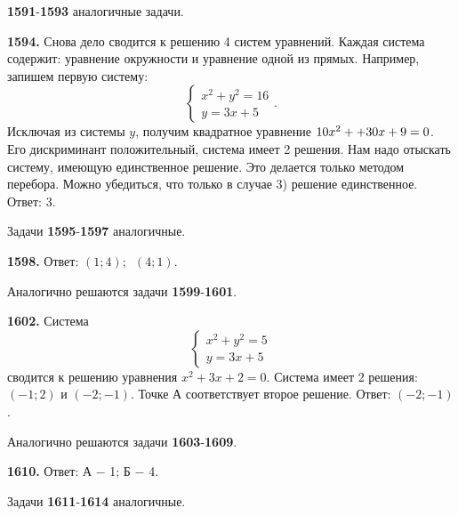 \textbf{1591}-\textbf{1593}  аналогичные задачи.

\textbf{1594.} Снова дело сводится к решению 4 систем уравнений. Каждая система содержит: уравнение окружности и уравнение одной из прямых. Например, запишем первую систему:$$\begin{cases}
	x^2+y^2=16
	\\
	y=3x+5	
\end{cases}.$$
Исключая из системы $y$, получим квадратное уравнение $10x^2+\linebreak+30x+9=0$. Его дискриминант положительный, система имеет 2 решения. Нам надо отыскать систему, имеющую единственное решение. Это делается только методом перебора. Можно убедиться, что только в случае 3) решение единственное. \newline \null \hspace*{\fill} Ответ: $3$.

Задачи \textbf{1595}-\textbf{1597} аналогичные.

\textbf{1598.} \newline \null \hspace*{\fill} Ответ: $(1;4);\enspace (4;1)$.

Аналогично решаются задачи  \textbf{1599}-\textbf{1601}.

\textbf{1602.} Система $$\begin{cases}
	x^2+y^2=5
	\\
	y=3x+5	
\end{cases}$$ сводится к решению уравнения $x^2+3x+2=0$. Система имеет 2 решения: $(-1;2)$ и $(-2;-1)$. Точке $А$ соответствует второе решение.\newline \null \hspace*{\fill} Ответ: $(-2;-1)$.

Аналогично решаются задачи \textbf{1603}-\textbf{1609}.

\textbf{1610.}\newline \null \hspace*{\fill} Ответ: А $-$ 1; Б $-$ 4.

Задачи \textbf{1611}-\textbf{1614}  аналогичные.
